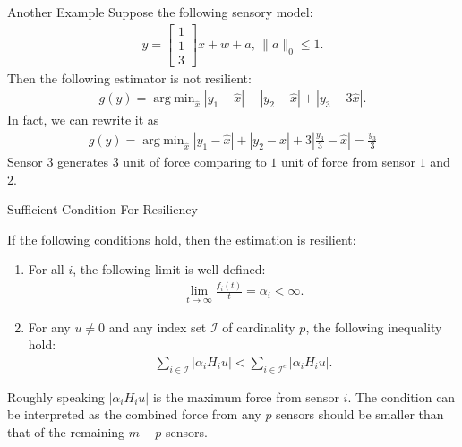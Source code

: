 \documentclass[10pt]{beamer}
\DeclareMathOperator{\argmin}{arg\;min}
\begin{document}
\begin{frame}{Another Example}
  Suppose the following sensory model:
  \begin{align*}
    y = \begin{bmatrix}
      1\\
      1\\
      3
    \end{bmatrix}x + w+a ,\,\|a\|_0\leq 1.
  \end{align*}
  Then the following estimator is not resilient:
  \begin{align*}
    g(y) = \argmin_{\hat x}  |y_1-\hat x|+|y_2-\hat x|+|y_3-3\hat x|.
  \end{align*}
  In fact, we can rewrite it as
  \begin{align*}
    g(y) = \argmin_{\hat x}  |y_1-\hat x|+|y_2-\hat x|+3\left|\frac{y_3}{3}-\hat x\right| = \frac{y_3}{3}
  \end{align*}
  Sensor $3$ generates $3$ unit of force comparing to $1$ unit of force from sensor $1$ and $2$.
\end{frame}


\begin{frame}{Sufficient Condition For Resiliency}
  \begin{theorem}
    If the following conditions hold, then the estimation is resilient:
    \begin{enumerate}
    \item For all $i$, the following limit is well-defined:
      \begin{align*}
        \lim_{t\rightarrow\infty}\frac{f_i(t)}{t} = \alpha_i < \infty.
      \end{align*}
    \item For any $u\neq 0$ and any index set $\mathcal I$ of cardinality $p$, the following inequality hold:
      \begin{align*}
        \sum_{i\in \mathcal I} |\alpha_i H_i u| < \sum_{i\in \mathcal I^c} |\alpha_i H_i u|.
      \end{align*}
    \end{enumerate}
  \end{theorem}
  Roughly speaking $|\alpha_i H_i u|$ is the maximum force from sensor $i$. The condition can be interpreted as the combined force from any $p$ sensors should be smaller than that of the remaining $m-p$ sensors.
\end{frame}
\end{document}
